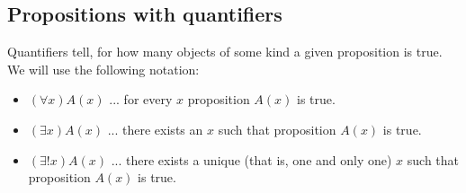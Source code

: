 \documentclass[11pt,paper=b5,footinclude,headinclude]{scrbook} %
\def\ali {{~\vee~}}
\def\inn {{~\wedge~}}
\def\sledi {{~\Rightarrow~}}
\theoremstyle{remark}
\theoremstyle{definition} %
\begin{document}

\subsection{Propositions with quantifiers}
Quantifiers tell, for  how many objects of some kind a given proposition is true.
We will use the following notation:

%
%
%
\begin{itemize}
  \item
  $(\forall x) A(x)$ ... for every $x$ proposition $A(x)$ is true.
  \item
  $(\exists  x) A(x)$ ... there exists an $x$ such that proposition $A(x)$ is true.
  \item
  $(\exists!  x) A(x)$ ... there exists a unique (that is, one and only one) $x$ such that proposition $A(x)$ is true.
\end{itemize}
\end{document}
